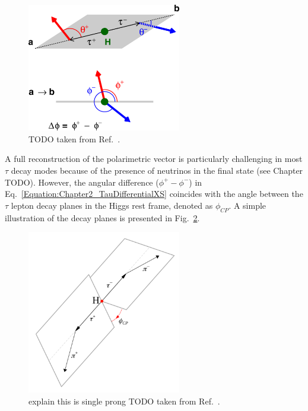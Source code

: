 \begin{figure}[h]
\centering
\includegraphics[width= 0.6\textwidth]{Figures/Chapter2/PolarimetricVector_Definition.png}
\caption{TODO taken from Ref.~\cite{PolarimetricVectorDefinition}.}
\label{Figure:Chapter2_PolarimetricVector_Definition}
\end{figure}

A full reconstruction of the polarimetric vector is particularly challenging in most $\tau$ decay modes because of the presence of neutrinos in the final state (see Chapter TODO). However, the angular difference ($\phi^+-\phi^-$) in Eq.~\ref{Equation:Chapter2_TauDifferentialXS} coincides with the angle between the $\tau$ lepton decay planes in the Higgs rest frame, denoted as $\phi_{CP}$. A simple illustration of the decay planes is presented in Fig.~\ref{Figure:Chapter2_DecayPlanes}.

\begin{figure}[h]
\centering
\includegraphics[width= 0.6\textwidth]{Figures/Chapter2/DecayPlanes.png}
\caption{explain this is single prong TODO taken from Ref.~\cite{HiggsCP_CMS_2021}.}
\label{Figure:Chapter2_DecayPlanes}
\end{figure}

